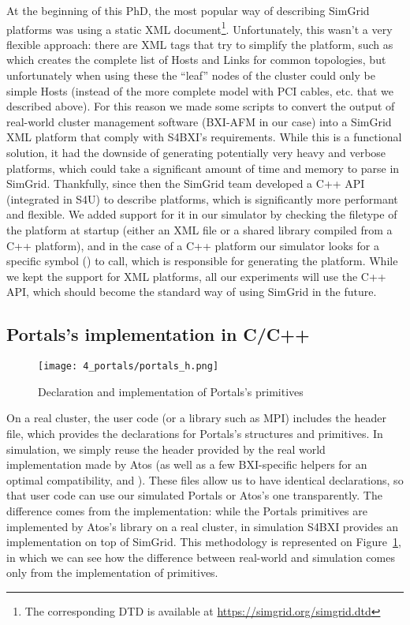 At the beginning of this PhD, the most popular way of describing SimGrid
platforms was using a static XML document\footnote{The corresponding DTD is
available at \url{https://simgrid.org/simgrid.dtd}}. Unfortunately, this wasn't
a very flexible approach: there are XML tags that try to simplify the platform,
such as  which creates the complete list of Hosts and Links
for common topologies, but unfortunately when using these the ``leaf'' nodes of
the cluster could only be simple Hosts (instead of the more complete model with
PCI cables, etc. that we described above). For this reason we made some scripts
to convert the output of real-world cluster management software (BXI-AFM in our
case) into a SimGrid XML platform that comply with S4BXI's requirements. While
this is a functional solution, it had the downside of generating potentially
very heavy and verbose platforms, which could take a significant amount of time
and memory to parse in SimGrid. Thankfully, since then the SimGrid team
developed a C++ API (integrated in S4U) to describe platforms, which is
significantly more performant and flexible. We added support for it in our
simulator by checking the filetype of the platform at startup (either an XML
file or a shared library compiled from a C++ platform), and in the case of a C++
platform our simulator looks for a specific symbol () to
call, which is responsible for generating the platform. While we kept the
support for XML platforms, all our experiments will use the C++ API, which
should become the standard way of using SimGrid in the future.

\subsection{Portals's implementation in C/C++}

\begin{figure}[!ht]
    \centering
    \texttt{[image: 4\_portals/portals\_h.png]}
    \caption{Declaration and implementation of Portals's primitives}
    \label{fig:4_portals:portals_h}
\end{figure}

On a real cluster, the user code (or a library such as MPI) includes the
 header file, which provides the declarations for Portals's
structures and primitives. In simulation, we simply reuse the
 header provided by the real world implementation made by
Atos (as well as a few BXI-specific helpers for an optimal compatibility,
 and ). These files allow
us to have identical declarations, so that user code can use our simulated
Portals or Atos's one transparently. The difference comes from the
implementation: while the Portals primitives are implemented by Atos's library
on a real cluster, in simulation S4BXI provides an implementation on top of
SimGrid. This methodology is represented on
Figure~\ref{fig:4_portals:portals_h}, in which we can see how the difference
between real-world and simulation comes only from the implementation of
primitives.


